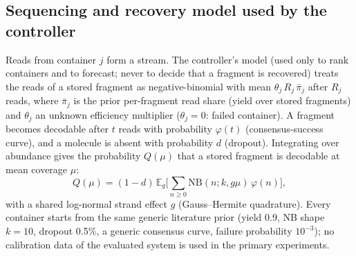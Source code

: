 \documentclass[acmsmall,screen]{acmart}
\newcommand{\E}{\mathbb{E}}
\begin{document}
\subsection{Sequencing and recovery model used by the controller}
Reads from container $j$ form a stream.  The controller's model (used only to rank containers
and to forecast; never to decide that a fragment is recovered) treats the reads of a stored
fragment as negative-binomial with mean $\theta_j\,R_j\,\bar\pi_j$ after $R_j$ reads, where
$\bar\pi_j$ is the prior per-fragment read share (yield over stored fragments) and $\theta_j$ an
unknown efficiency multiplier ($\theta_j{=}0$: failed container).  A fragment becomes decodable
after $t$ reads with probability $\varphi(t)$ (consensus-success curve), and a molecule is absent
with probability $d$ (dropout).  Integrating over abundance gives the probability $Q(\mu)$ that a
stored fragment is decodable at mean coverage $\mu$:
\begin{equation}
Q(\mu)=(1-d)\,\E_g\Big[\sum_{n\ge0}\mathrm{NB}(n;k,g\mu)\,\varphi(n)\Big],
\label{eq:Q}
\end{equation}
with a shared log-normal strand effect $g$ (Gauss--Hermite quadrature).  Every container starts
from the same generic literature prior (yield 0.9, NB shape $k{=}10$, dropout 0.5\%, a generic
consensus curve, failure probability $10^{-3}$); no calibration data of the evaluated system is
used in the primary experiments.
\end{document}
